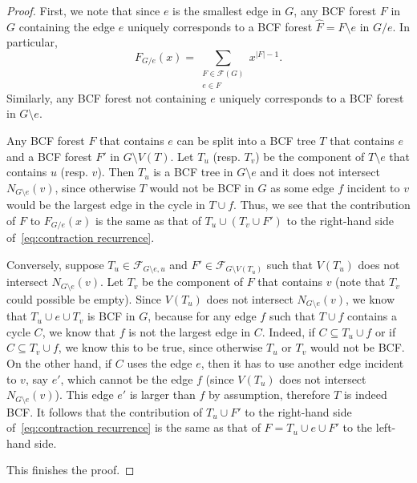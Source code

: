 \documentclass[a4paper,11pt,reqno]{amsart}
\numberwithin{equation}{section}
\begin{document}
\begin{proof}
First, we note that since $e$ is the smallest edge in $G$, any BCF forest $F$ in $G$ containing the edge $e$ uniquely corresponds to a BCF forest $\hat F=F\setminus e$ in $G/e$.
In particular, 
\[F_{G/e}(x)=\sum_{\substack{F\in \mathcal{F}(G)\\  e\in F}} x^{|F|-1}.\]
Similarly, any BCF forest not containing $e$ uniquely corresponds to a BCF forest in $G\setminus e$.

Any BCF forest $F$ that contains $e$ can be split into a BCF tree $T$ that contains $e$ and a BCF forest $F'$ in $G\setminus V(T)$.
Let $T_u$ (resp. $T_v$) be the component of $T\setminus e$ that contains $u$ (resp. $v$). 
Then $T_u$ is a BCF tree in $G\setminus e$ and it does not intersect $N_{G\setminus e}(v)$, since otherwise $T$ would not be BCF in $G$ as some edge $f$ incident to $v$ would be the largest edge in the cycle in $T\cup f$.
Thus, we  see that the contribution of $F$ to $F_{G/e}(x)$ is the same as that of $T_u\cup (T_v\cup F')$ to the right-hand side of~\eqref{eq:contraction recurrence}.

Conversely, suppose $T_u\in \mathcal{F}_{G\setminus e,u}$  and $F'\in \mathcal{F}_{G\setminus V(T_u)}$ such that $V(T_u)$ does not intersect $N_{G\setminus e}(v)$.
Let $T_v$ be the component of $F$ that contains $v$ (note that $T_v$ could possible be empty).
Since $V(T_u)$ does not intersect $N_{G\setminus e}(v)$, we know that $T_u\cup e\cup T_v$ is BCF in $G$, because for any edge $f$ such that $T\cup f$ contains a cycle $C$, we know that $f$ is not the largest edge in $C$.
Indeed, if $C\subseteq T_u\cup f$ or if $C\subseteq T_v \cup f$, we know this to be true, since otherwise $T_u$ or $T_v$ would not be BCF. On the other hand, if $C$ uses the edge $e$, then it has to use another edge incident to $v$, say $e'$, which cannot be the edge $f$ (since $V(T_u)$ does not intersect $N_{G\setminus e}(v)$). This edge $e'$ is larger than $f$ by assumption, therefore $T$ is indeed BCF.
It follows that the contribution of $T_u\cup F'$ to the right-hand side of~\eqref{eq:contraction recurrence} is the same as that of $F=T_u \cup e\cup F'$ to the left-hand side.



This finishes the proof.
\end{proof}

\end{document}
